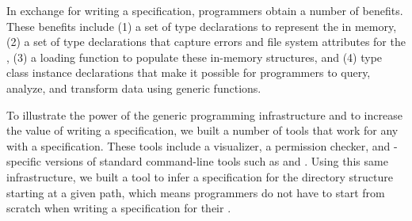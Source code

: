 
In exchange for writing a \forest{} specification,  programmers obtain
a number of benefits.  These benefits include 
(1) a set of type declarations to represent the \filestore{} in memory,
(2) a set of type declarations that capture errors and file system attributes for the \filestore{},
(3) a loading function to populate these in-memory structures, and
(4) type class instance declarations that make it possible for
   programmers to query, analyze, and transform \filestore{} data
   using generic functions.

To illustrate the power of the generic programming infrastructure and
to increase the value of writing a \forest{} specification, we built a
number of tools that work for any \filestore{} with a
\forest{} specification.  These tools include a \filestore{}
visualizer, a permission checker, and \filestore{}-specific versions
of standard command-line tools such as  and .
Using this same infrastructure, we built a tool to infer
a \forest{} specification for the directory structure starting at a
given path, which means programmers do
not have to start from scratch when writing a specification for their
\filestores{}. 

